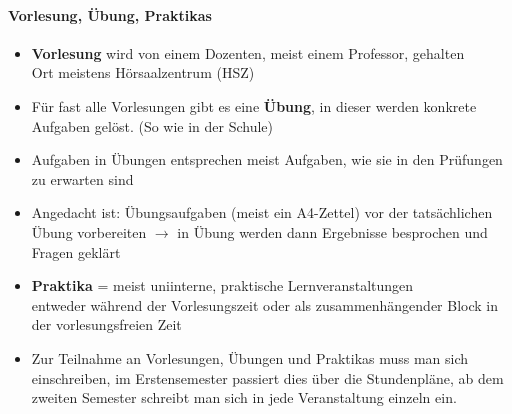 \documentclass[a4paper,12pt]{report}
\begin{document}
\paragraph{Vorlesung, Übung, Praktikas}
\begin{itemize}
	\item \textbf{Vorlesung} wird von einem Dozenten, meist einem Professor, gehalten\\
	Ort meistens Hörsaalzentrum (HSZ)
	\item Für fast alle Vorlesungen gibt es eine \textbf{Übung}, in dieser werden konkrete Aufgaben gelöst. (So wie in der Schule)
	\item Aufgaben in Übungen entsprechen meist Aufgaben, wie sie in den Prüfungen zu erwarten sind
	\item Angedacht ist: Übungsaufgaben (meist ein A4-Zettel) vor der tatsächlichen Übung vorbereiten $\rightarrow$ in Übung werden dann Ergebnisse besprochen und Fragen geklärt
	\item \textbf{Praktika} = meist uniinterne, praktische Lernveranstaltungen\\
		entweder während der Vorlesungszeit oder als zusammenhängender Block in der vorlesungsfreien Zeit
	\item Zur Teilnahme an Vorlesungen, Übungen und Praktikas muss man sich einschreiben, im Erstensemester passiert dies über die Stundenpläne, ab dem zweiten Semester schreibt man sich in jede Veranstaltung einzeln ein.
\end{itemize}
		
\end{document}
